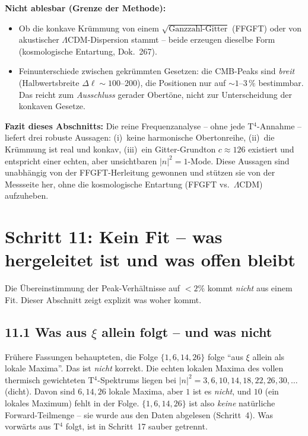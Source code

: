 \textbf{Nicht ablesbar (Grenze der Methode):}
\begin{itemize}
  \item Ob die konkave Krümmung von einem $\sqrt{\text{Ganzzahl-Gitter}}$
        (FFGFT) oder von akustischer $\Lambda$CDM-Dispersion stammt --
        beide erzeugen dieselbe Form (kosmologische Entartung, Dok.~267).
  \item Feinunterschiede zwischen gekrümmten Gesetzen: die CMB-Peaks sind
        \emph{breit} (Halbwertsbreite $\Delta\ell \sim 100$--$200$), die
        Positionen nur auf $\sim 1$--$3\,\%$ bestimmbar. Das reicht zum
        \emph{Ausschluss} gerader Obertöne, nicht zur Unterscheidung der
        konkaven Gesetze.
\end{itemize}

\textbf{Fazit dieses Abschnitts:} Die reine Frequenzanalyse -- ohne jede
T$^4$-Annahme -- liefert drei robuste Aussagen: (i)~keine harmonische
Obertonreihe, (ii)~die Krümmung ist real und konkav, (iii)~ein
Gitter-Grundton $c \approx 126$ existiert und entspricht einer echten,
aber unsichtbaren $|n|^2{=}1$-Mode. Diese Aussagen sind unabhängig von
der FFGFT-Herleitung gewonnen und stützen sie von der Messseite her,
ohne die kosmologische Entartung (FFGFT vs.\ $\Lambda$CDM) aufzuheben.

\section{Schritt 11: Kein Fit -- was hergeleitet ist und was offen bleibt}

Die Übereinstimmung der Peak-Verhältnisse auf $< 2\%$ kommt
\emph{nicht} aus einem Fit. Dieser Abschnitt zeigt explizit
was woher kommt.

\subsection*{11.1 Was aus $\xi$ allein folgt -- und was nicht}

\begin{tcolorbox}[colback=red!4!white, colframe=red!55!black,
  title={Korrektur gegenüber früheren Fassungen}]
Frühere Fassungen behaupteten, die Folge $\{1,6,14,26\}$ folge ``aus
$\xi$ allein als lokale Maxima''. Das ist \emph{nicht} korrekt. Die
echten lokalen Maxima des vollen thermisch gewichteten T$^4$-Spektrums
liegen bei $|n|^2 = 3, 6, 10, 14, 18, 22, 26, 30, \ldots$ (dicht). Davon
sind $6,14,26$ lokale Maxima, aber $1$ ist es \emph{nicht}, und $10$
(ein lokales Maximum) fehlt in der Folge. $\{1,6,14,26\}$ ist also
\emph{keine} natürliche Forward-Teilmenge -- sie wurde aus den Daten
abgelesen (Schritt~4). Was vorwärts aus T$^4$ folgt, ist in Schritt~17
sauber getrennt.
\end{tcolorbox}

